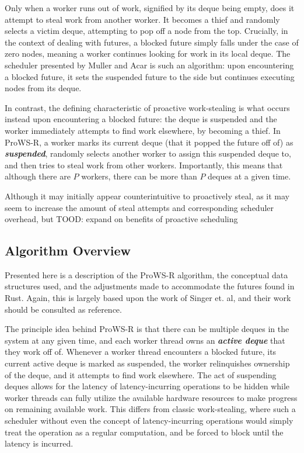 \documentclass[bsc,frontabs,singlespacing,parskip,deptreport,normalheadings]{infthesis}
\begin{document}
Only when a worker runs out of work, signified by its deque being empty, does it
attempt to steal work from another worker. It becomes a thief and randomly
selects a victim deque, attempting to pop off a node from the top. Crucially, in
the context of dealing with futures, a blocked future simply falls under the
case of zero nodes, meaning a worker continues looking for work in its local
deque. The scheduler presented by Muller and Acar
\cite{muller_latency-hiding_2016} is such an algorithm: upon encountering a
blocked future, it sets the suspended future to the side but continues executing
nodes from its deque.

In contrast, the defining characteristic of proactive work-stealing is what
occurs instead upon encountering a blocked future: the deque is suspended and
the worker immediately attempts to find work elsewhere, by becoming a thief. In
ProWS-R, a worker marks its current deque (that it popped the future off of) as
\textbf{\textit{suspended}}, randomly selects another worker to assign this
suspended deque to, and then tries to steal work from other workers.
Importantly, this means that although there are \(P\) workers, there can be more
than \(P\) deques at a given time.

Although it may initially appear counterintuitive to proactively steal, as it
may seem to increase the amount of steal attempts and corresponding scheduler
overhead, but  TOOD: expand on benefits of proactive scheduling

\subsection{Algorithm Overview}
\label{subsection:the_algorithm_in_detail}

Presented here is a description of the ProWS-R algorithm, the conceptual data
structures used, and the adjustments made to accommodate the futures found in
Rust. Again, this is largely based upon the work of Singer et. al, and their
work should be consulted as reference.

The principle idea behind ProWS-R is that there can be multiple deques in the
system at any given time, and each worker thread owns an \textbf{\textit{active
deque}} that they work off of. Whenever a worker thread encounters a blocked
future, its current active deque is marked as suspended, the worker relinquishes
ownership of the deque, and it attempts to find work elsewhere. The act of
suspending deques allows for the latency of latency-incurring operations to be
hidden while worker threads can fully utilize the available hardware resources
to make progress on remaining available work. This differs from classic
work-stealing, where such a scheduler without even the concept of
latency-incurring operations would simply treat the operation as a regular
computation, and be forced to block until the latency is incurred.
\end{document}
